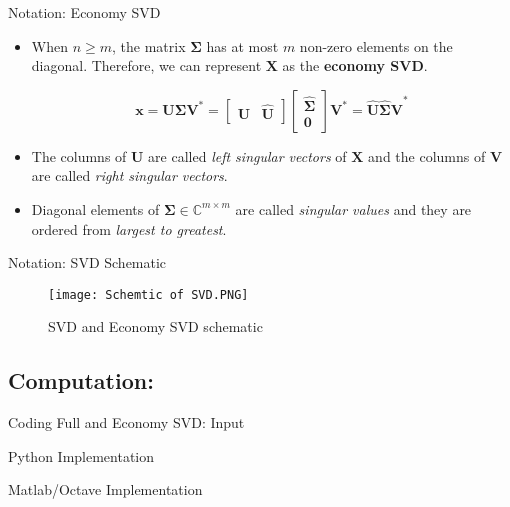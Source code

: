 \documentclass[9pt]{beamer}
\begin{document}
\begin{frame}{Notation: Economy SVD}
    \begin{itemize}
        \item When $n \geq m$, the matrix $\mathbf{\Sigma}$ has at most $m$ non-zero elements on the diagonal. Therefore, we can represent $\mathbf{X}$ as the \textbf{economy SVD}.
        
        \begin{equation}
            \mathbf{x} = \mathbf{U\Sigma V}^{*} = 
            \begin{bmatrix}
                    \hat{\mathbf{U}} & \hat{\mathbf{U}}
            \end{bmatrix}
            \begin{bmatrix}
                    \hat{\mathbf{\Sigma}}\\
                    \mathbf{0}
            \end{bmatrix}
            \mathbf{V}^{*}
            = \mathbf{\hat{U}\hat{\Sigma}V}^{*}
        \end{equation}
    
        \item The columns of $\mathbf{U}$ are called \textit{left singular vectors} of $\mathbf{X}$ and the columns of $\mathbf{V}$ are called \textit{right singular vectors}. 
        \item Diagonal elements of $\mathbf{\Sigma}\in \mathbb{C}^{m \times m}$ are called \textit{singular values} and they are ordered from \textit{largest to greatest}.
    \end{itemize}
\end{frame}


\begin{frame}{Notation: SVD Schematic}
    \begin{figure}
        \texttt{[image: Schemtic of SVD.PNG]}
        \caption{SVD and Economy SVD schematic}
    \end{figure}
\end{frame}

\subsection{Computation:}
\begin{frame}{Coding Full and Economy SVD: Input }
\begin{center}
    Python Implementation
\end{center}
    
\begin{center}
    Matlab/Octave Implementation
\end{center}
    
    
\end{frame}
\end{document}
